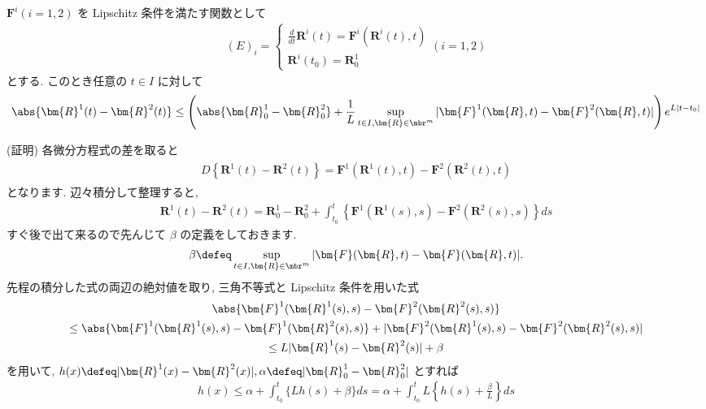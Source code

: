 \documentclass[openany, a4paper, oneside]{jsbook}
\begin{document}
\begin{thm}[解の初期値および解に対する連続依存性]
$\bm{F}^i (i=1,2)$ を Lipschitz 条件を満たす関数として
\begin{gather}
(E)_i
=
\begin{cases}
\frac{d} {dt} \bm{R}^i (t)
=
\bm{F}^i ( \bm{R}^i (t) , t) \\
\bm{R}^i (t_0)
=
\bm{R}_0^1
\end{cases}
(i = 1,2)
\end{gather}
とする.
このとき任意の $t \in I$ に対して
\begin{gather}
\abs{\bm{R}^1 (t) - \bm{R}^2 (t)}
\leq
\left (
\abs{\bm{R}^1_0 - \bm{R}^2_0}
+\frac{ 1 } {L} \sup_{t \in I , \bm{R} \in \mbr^m} | \bm{F}^1 (\bm{R},t)- \bm{F}^2 (\bm{R},t) |
\right)
e^{L| t - t_0 |}
\end{gather}
\end{thm}
(証明)
各微分方程式の差を取ると
\begin{gather}
\begin{split}
D \left\{ \bm{R}^1 (t) - \bm{R}^2 (t) \right\}
=
\bm{F}^1 (\bm{R}^1 (t) , t) - \bm{F}^2 ( \bm{R}^2 (t) , t )
\end{split}
\end{gather}
となります.
辺々積分して整理すると,
\begin{gather}
\bm{R}^1 (t) - \bm{R} ^2 (t)
=
\bm{R}^1_0 - \bm{R}^2_0 + \int_{t_0}^t \left\{ \bm{F}^1 (\bm{R}^1 (s) , s) - \bm{F}^2 ( \bm{R}^2 (s) , s ) \right\}  ds
\end{gather}
すぐ後で出て来るので先んじて $\beta$ の定義をしておきます.
\begin{gather}
\beta
\defeq
\sup_{t \in I , \bm{R} \in \mbr^m}| \bm{F}( \bm{R} , t ) - \bm{F} ( \bm{R} , t ) |.
\end{gather}
先程の積分した式の両辺の絶対値を取り, 三角不等式と Lipschitz 条件を用いた式
\begin{gather}
\abs{\bm{F}^1 (\bm{R}^1 (s) , s) - \bm{F}^2 ( \bm{R}^2 (s) , s )} \\
\leq
\abs{\bm{F}^1 (\bm{R}^1 (s) , s) - \bm{F}^1 ( \bm{R}^2 (s) , s )}
+| \bm{F}^2 (\bm{R}^1 (s) , s) - \bm{F}^2 ( \bm{R}^2 (s) , s ) | \\
\leq
L | \bm{R}^1 (s) - \bm{R}^2 (s) | + \beta
\end{gather}
を用いて,  $h (x) \defeq | \bm{R}^1 (x) - \bm{R}^2 (x) |, \alpha \defeq | \bm{R}^1_0 - \bm{R}^2_0 |$ とすれば
\begin{gather}
h (x)
\leq
\alpha + \int_{t_0}^t \{ L h (s) + \beta \} ds
=
\alpha + \int_{t_0}^t L \left \{  h (s) + \frac{\beta} {L} \right \} ds
\end{gather}
\end{document}
